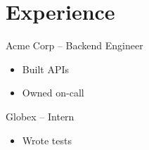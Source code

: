 \documentclass{article}
\begin{document}
\section*{Experience}
Acme Corp -- Backend Engineer
\begin{itemize}
\item Built APIs
\item Owned on-call
\end{itemize}
Globex -- Intern
\begin{itemize}
\item Wrote tests
\end{itemize}
\end{document}
